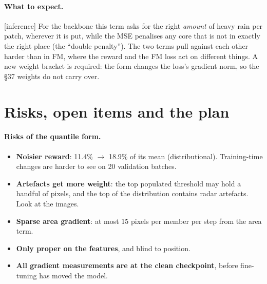 \documentclass[11pt,a4paper]{article}
\newcommand{\status}[1]{\textsf{\small[#1]}}
\begin{document}
\paragraph{What to expect.} \status{inference} For the backbone this term asks for the right \emph{amount} of heavy rain
per patch, wherever it is put, while the MSE penalises any core that is not in exactly the right place (the ``double
penalty''). The two terms pull against each other harder than in FM, where the reward and the FM loss act on different
things. A new weight bracket is required: the form changes the loss's gradient norm, so the \S37 weights do not carry
over.

\section{Risks, open items and the plan}\label{sec:plan}

\paragraph{Risks of the quantile form.}
\begin{itemize}[nosep,leftmargin=1.2em]
\item \textbf{Noisier reward}: 11.4\% $\to$ 18.9\% of its mean (distributional). Training-time changes are harder to see on
20 validation batches.
\item \textbf{Artefacts get more weight}: the top populated threshold may hold a handful of pixels, and the top of the
distribution contains radar artefacts. Look at the images.
\item \textbf{Sparse area gradient}: at most 15 pixels per member per step from the area term.
\item \textbf{Only proper on the features}, and blind to position.
\item \textbf{All gradient measurements are at the clean checkpoint}, before fine-tuning has moved the model.
\end{itemize}
\end{document}

